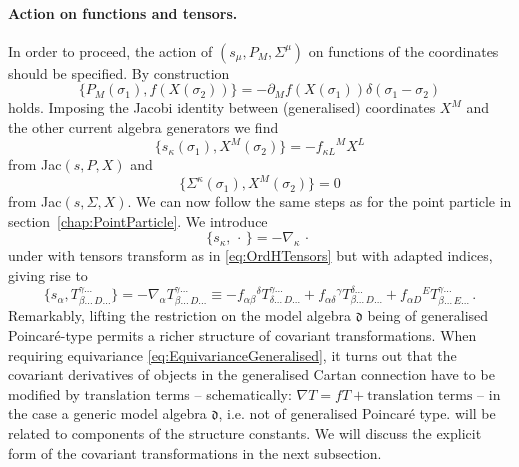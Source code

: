 \documentclass[11pt,a4paper]{article}
\numberwithin{equation}{section}
\begin{document}
\paragraph{Action on functions and tensors.} In order to proceed, the action of $(s_\mu , P_M , \Sigma^\mu)$ on functions of the coordinates should be specified. By construction
\begin{equation}
	\{P_M(\sigma_1) , f(X(\sigma_2)) \} = -\partial_M f(X(\sigma_1)) \delta(\sigma_1 - \sigma_2)
\end{equation}
holds. Imposing the Jacobi identity between (generalised) coordinates $X^M$ and the other current algebra generators we find
\begin{equation}\label{eq:actionOnCoordinates}
  \{ s_\kappa (\sigma_1) , X^M(\sigma_2) \} = - {f_{\kappa L}}^M X^L 
\end{equation}
from Jac$(s,P,X)$ and
\begin{equation}
  \{ \Sigma^\kappa (\sigma_1) , X^M(\sigma_2) \} = 0
\end{equation}
from Jac$(s,\Sigma,X)$. We can now follow the same steps as for the point particle in section~\ref{chap:PointParticle}. We introduce
\begin{equation}
  \{ s_\kappa , \, \cdot \, \} = - \nabla_\kappa \, \cdot \,
\end{equation}
under with tensors transform as in \eqref{eq:OrdHTensors} but with adapted indices, giving rise to
\begin{equation}
  \{ s_\alpha, T^{\gamma\dots}_{\beta\dots\,D\dots} \} = - \nabla_\alpha T^{\gamma\dots}_{\beta\dots\, D\dots} \equiv -f_{\alpha\beta}{}^\delta T^{\gamma\dots}_{\delta\dots\,D\dots} + f_{\alpha\delta}{}^\gamma T^{\delta\dots}_{\beta\dots\,D\dots} + f_{\alpha D}{}^E T^{\gamma\dots}_{\beta\dots\,E\dots}\,.
\end{equation}
Remarkably, lifting the restriction on the model algebra $\mathfrak{d}$ being of generalised Poincar\'e-type permits a richer structure of covariant transformations. When requiring equivariance \eqref{eq:EquivarianceGeneralised}, it turns out that the covariant derivatives of objects in the generalised Cartan connection have to be modified by translation terms -- schematically: $\nabla T = f T + \text{translation terms}$ -- in the case a generic model algebra $\mathfrak{d}$, i.e. not of generalised Poincar\'e type. will be related to components of the structure constants. We will discuss the explicit form of the covariant transformations in the next subsection. 
\end{document}
